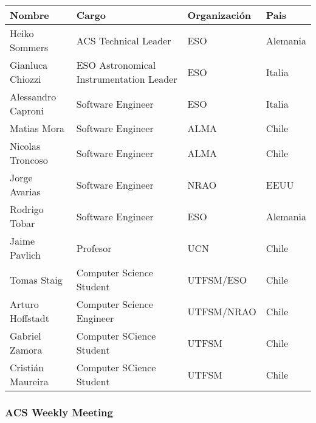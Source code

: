\begin{tabular}{|l|l|l|l|}
	\hline
	{\bf Nombre} & {\bf Cargo} & {\bf Organización} & {\bf Pais} \\\hline
	Heiko Sommers & ACS Technical Leader & ESO & Alemania \\\hline
	Gianluca Chiozzi & ESO Astronomical Instrumentation Leader & ESO & Italia \\\hline
	Alessandro Caproni & Software Engineer& ESO & Italia \\\hline
	Matias Mora & Software Engineer & ALMA & Chile \\\hline
	Nicolas Troncoso & Software Engineer & ALMA & Chile \\\hline
	Jorge Avarias & Software Engineer & NRAO & EEUU \\\hline
	Rodrigo Tobar & Software Engineer & ESO & Alemania \\\hline
	Jaime Pavlich & Profesor & UCN & Chile \\\hline
	Tomas Staig & Computer Science Student & UTFSM/ESO & Chile \\\hline
	Arturo Hoffstadt & Computer Science Engineer & UTFSM/NRAO & Chile \\\hline
	Gabriel Zamora & Computer SCience Student & UTFSM & Chile \\\hline
	Cristián Maureira & Computer SCience Student & UTFSM & Chile \\\hline	
\end{tabular}

\subsubsection{ACS Weekly Meeting}

